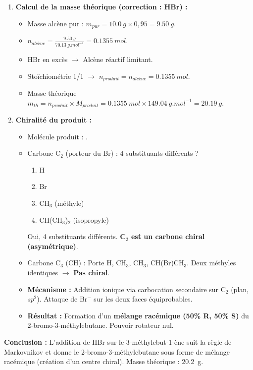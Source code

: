\documentclass[11pt]{article}
\begin{document}
\begin{exoresolu}
\begin{enumerate}
    \item \textbf{Calcul de la masse théorique (correction : HBr) :}
    \begin{itemize}
        \item Masse alcène pur : $m_{pur} = \SI{10,0}{g} \times 0,95 = \SI{9,50}{g}$.
        \item $n_{alcène} = \frac{\SI{9,50}{g}}{\SI{70,13}{g.mol^{-1}}} = \SI{0,1355}{mol}$.
        \item HBr en excès $\rightarrow$ Alcène réactif limitant.
        \item Stoïchiométrie 1/1 $\rightarrow$ $n_{produit} = n_{alcène} = \SI{0,1355}{mol}$.
        \item Masse théorique $m_{th} = n_{produit} \times M_{produit} = \SI{0,1355}{mol} \times \SI{149,04}{g.mol^{-1}} = \boxed{\SI{20,19}{g}}$.
    \end{itemize}

    \item \textbf{Chiralité du produit :}
    \begin{itemize}
        \item Molécule produit : .
        \item Carbone C$_2$ (porteur du Br) : 4 substituants différents ?
            \begin{enumerate}
                \item H
                \item Br
                \item CH$_3$ (méthyle)
                \item CH(CH$_3$)$_2$ (isopropyle)
            \end{enumerate}
            Oui, 4 substituants différents. \textbf{C$_2$ est un carbone chiral (asymétrique)}.
        \item Carbone C$_3$ (CH) : Porte H, CH$_3$, CH$_3$, CH(Br)CH$_3$. Deux méthyles identiques $\rightarrow$ \textbf{Pas chiral}.
        \item \textbf{Mécanisme :} Addition ionique via carbocation secondaire sur C$_2$ (plan, \textit{sp}$^2$). Attaque de Br$^-$ sur les deux faces équiprobables.
        \item \textbf{Résultat :} Formation d'un \textbf{mélange racémique (50\% R, 50\% S)} du 2-bromo-3-méthylebutane. Pouvoir rotateur nul.
    \end{itemize}
\end{enumerate}
\textbf{Conclusion :} L'addition de HBr sur le 3-méthylebut-1-ène suit la règle de Markovnikov et donne le 2-bromo-3-méthylebutane sous forme de mélange racémique (création d'un centre chiral). Masse théorique : \SI{20,2}{g}.
\end{exoresolu}
\end{document}

